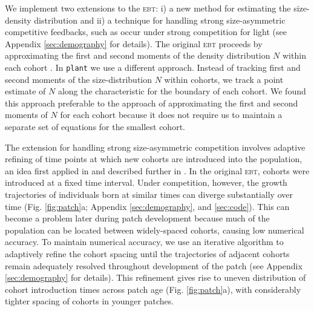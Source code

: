 \documentclass[a4paper,11pt]{article}
\newcommand{\plant}{\texttt{plant}}
\begin{document}
We implement two extensions to the \textsc{ebt}: i) a new method for
estimating the size-density distribution and ii) a technique for
handling strong size-asymmetric competitive feedbacks, such as occur
under strong competition for light (see Appendix \ref{sec:demography}
for details). The original \textsc{ebt} proceeds by approximating the
first and second moments of the density distribution \(N\) within each
cohort \citep{Deroos-1997}.
%
In {\plant} we use a different approach. Instead of tracking first and
second moments of the size-distribution \(N\) within cohorts, we track a
point estimate of \(N\) along the characteristic for the boundary of
each cohort. We found this approach preferable to the approach of
approximating the first and second moments of \(N\) for each cohort
because it does not require us to maintain a separate set of equations for the smallest
cohort.

The extension for handling strong size-asymmetric competition involves
adaptive refining of time points at which new cohorts are introduced
into the population, an idea first applied in \citet{Falster-2011} and
described further in \citet{Falster-2015}.
In the original \textsc{ebt}, cohorts were introduced at a fixed time
interval. Under competition, however, the growth
trajectories of individuals born at similar times can diverge
substantially over time (Fig. \ref{fig:patch}a; Appendix
\ref{sec:demography}, and \ref{sec:code}). This can become a problem later during patch
development because much of the population can be located between
widely-spaced cohorts, causing low numerical accuracy. To maintain
numerical accuracy, we use an iterative algorithm to adaptively refine
the cohort spacing until the trajectories of adjacent cohorts remain
adequately resolved throughout development of the patch (see Appendix
\ref{sec:demography} for details). This refinement gives rise to uneven
distribution of cohort introduction times across patch age (Fig.
\ref{fig:patch}a), with considerably tighter spacing of cohorts in
younger patches.
\end{document}
